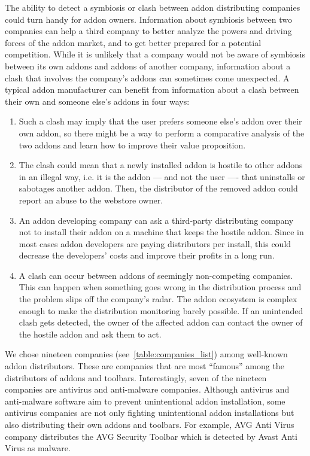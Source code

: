 \documentclass[ijoc,nonblindrev]{informs3} %
\numberwithin{equation}{subsection}
\begin{document}
The ability to detect a symbiosis or clash between addon distributing companies could turn handy for addon owners. Information about symbiosis between two companies can help a third company to better analyze the powers and driving forces of the addon market, and to get better prepared for a potential competition. While it is unlikely that a company would not be aware of symbiosis between its own addons and addons of another company, information about a clash that involves the company's addons can sometimes come unexpected. A typical addon manufacturer can benefit from information about a clash between their own and someone else's addons in four ways:
\begin{enumerate}
\item Such a clash may imply that the user prefers someone else's addon over their own addon, so there might be a way to perform a comparative analysis of the two addons and learn how to improve their value proposition.
\item The clash could mean that a newly installed addon is hostile to other addons in an illegal way, i.e. it is the addon --- and not the user ---- that uninstalls or sabotages another addon. Then, the distributor of the removed addon could report an abuse to the webstore owner.
\item An addon developing company can ask a third-party distributing company not to install their addon on a machine that keeps the hostile addon. Since in most cases addon developers are paying distributors per install, this could decrease the developers' costs and improve their profits in a long run.
\item A clash can occur between addons of seemingly non-competing companies. This can happen when something goes wrong in the distribution process and the problem slips off the company's radar. The addon ecosystem is complex enough to make the distribution monitoring barely possible. If an unintended clash gets detected, the owner of the affected addon can contact the owner of the hostile addon and ask them to act.
\end{enumerate}

We chose nineteen companies (see~\autoref{table:companies_list}) among well-known addon distributors. These are companies that are most ``famous'' among the distributors of addons and toolbars. Interestingly, seven of the nineteen companies are antivirus and anti-malware companies. 
Although antivirus and anti-malware software aim to prevent unintentional addon installation, some antivirus companies are not only fighting unintentional addon installations but also distributing their own addons and toolbars. For example, AVG Anti Virus company distributes the AVG Security Toolbar which is detected by Avast Anti Virus as malware.  
\end{document}

